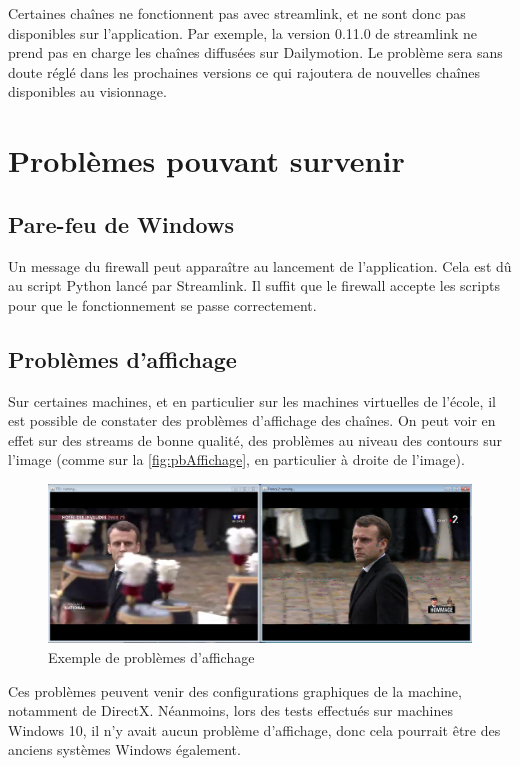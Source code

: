 \documentclass{polytech/polytech}
\begin{document}
Certaines chaînes ne fonctionnent pas avec streamlink, et ne sont donc pas disponibles sur l'application. Par exemple, la version 0.11.0 de streamlink ne prend pas en charge les chaînes diffusées sur Dailymotion. Le problème sera sans doute réglé dans les prochaines versions ce qui rajoutera de nouvelles chaînes disponibles au visionnage. 

\section{Problèmes pouvant survenir}


\subsection{Pare-feu de Windows}

Un message du firewall peut apparaître au lancement de l'application. Cela est dû au script Python lancé par Streamlink. Il suffit que le firewall accepte les scripts pour que le fonctionnement se passe correctement. 


\subsection{Problèmes d'affichage}

Sur certaines machines, et en particulier sur les machines virtuelles de l'école, il est possible de constater des problèmes d'affichage des chaînes. On peut voir en effet sur des streams de bonne qualité, des problèmes au niveau des contours sur l'image (comme sur la \autoref{fig:pbAffichage}, en particulier à droite de l'image).


\begin{figure}
	\includegraphics[scale=0.37]{images/imageQualite.png}
	\caption{Exemple de problèmes d'affichage}
	\label{fig:pbAffichage}
\end{figure}


Ces problèmes peuvent venir des configurations graphiques de la machine, notamment de DirectX. Néanmoins, lors des tests effectués sur machines Windows 10, il n'y avait aucun problème d'affichage, donc cela pourrait être des anciens systèmes Windows également.
\end{document}

